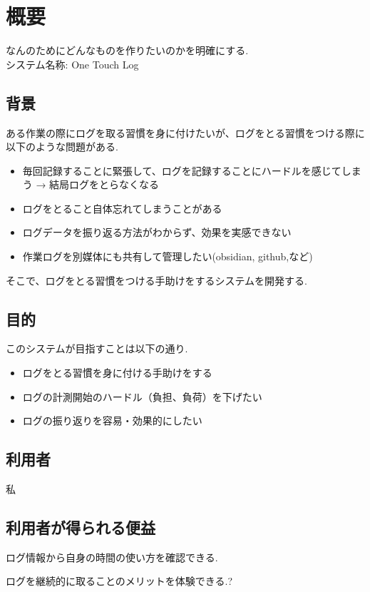 \section{概要} \label{sec:overview}

なんのためにどんなものを作りたいのかを明確にする. \\

システム名称: One Touch Log


\subsection{背景}

ある作業の際にログを取る習慣を身に付けたいが、ログをとる習慣をつける際に以下のような問題がある.

\begin{itemize}
  \item 毎回記録することに緊張して、ログを記録することにハードルを感じてしまう → 結局ログをとらなくなる
  \item ログをとること自体忘れてしまうことがある
  \item ログデータを振り返る方法がわからず、効果を実感できない
  \item 作業ログを別媒体にも共有して管理したい(obsidian, github,など)
\end{itemize}

そこで、ログをとる習慣をつける手助けをするシステムを開発する.


\subsection{目的}

このシステムが目指すことは以下の通り.

\begin{itemize}
  \item ログをとる習慣を身に付ける手助けをする
  \item ログの計測開始のハードル（負担、負荷）を下げたい
  \item ログの振り返りを容易・効果的にしたい
\end{itemize}


\subsection{利用者}

私

\subsection{利用者が得られる便益}

ログ情報から自身の時間の使い方を確認できる.

ログを継続的に取ることのメリットを体験できる.?
